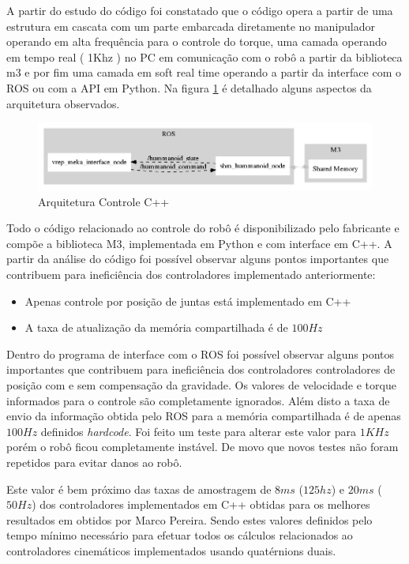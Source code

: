 
A partir do estudo do código foi constatado que o código opera a partir de uma estrutura em cascata com um parte embarcada diretamente no manipulador operando em alta frequência para o controle do torque, uma camada operando em tempo real ( 1Khz ) no PC em comunicação com o robô a partir da biblioteca m3 e por fim uma camada em soft real time operando a partir da interface com o ROS ou com a API em Python. Na figura \ref{fig:shm_arch} é detalhado alguns aspectos da arquitetura observados.

\begin{figure}
    \centering
    \includegraphics[width=1\linewidth]{figs/shm_arch}
    \caption{Arquitetura Controle C++}
    \label{fig:shm_arch}
\end{figure}

Todo o código relacionado ao controle do robô é disponibilizado pelo fabricante e compõe a biblioteca M3, implementada em Python e com interface em C++. A partir da análise do código foi possível observar alguns pontos importantes que contribuem para ineficiência dos controladores implementado anteriormente:

\begin{itemize}
    \item Apenas controle por posição de juntas está implementado em C++
    \item A taxa de atualização da memória compartilhada é de $100 Hz$
\end{itemize}

Dentro do programa de interface com o ROS foi possível observar alguns pontos importantes que contribuem para ineficiência dos controladores controladores de posição com e sem compensação da gravidade. Os valores de velocidade e torque informados para o controle são completamente ignorados. Além disto a taxa de envio da informação obtida pelo ROS para a memória compartilhada é de apenas $100Hz$ definidos \textit{hardcode}. Foi feito um teste para alterar este valor para $1KHz$ porém o robô ficou completamente instável. De movo que novos testes não foram repetidos para evitar danos ao robô.

Este valor é bem próximo das taxas de amostragem de $8 ms$ ($125 hz$) e $20 ms$ ($50 Hz$) dos controladores implementados em C++ obtidas para os melhores resultados em \cite{nobody} obtidos por Marco Pereira. Sendo estes valores definidos pelo tempo mínimo necessário para efetuar todos os cálculos relacionados ao controladores cinemáticos implementados usando quatérnions duais.

